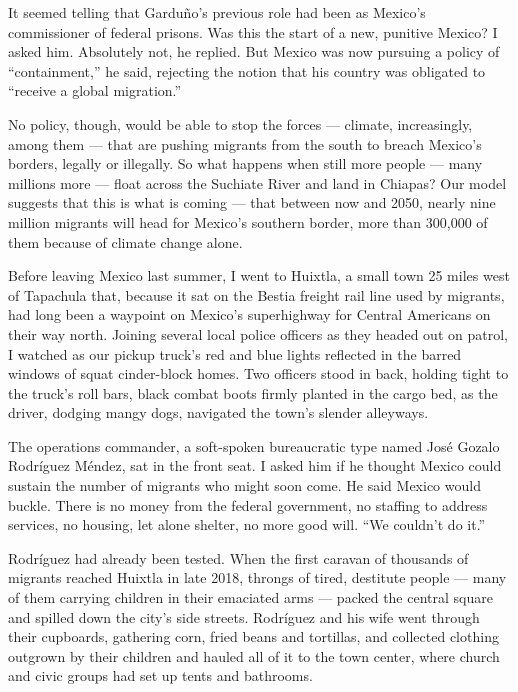 It seemed telling that Garduño's previous role had been as Mexico's
commissioner of federal prisons. Was this the start of a new, punitive
Mexico? I asked him. Absolutely not, he replied. But Mexico was now
pursuing a policy of ``containment,'' he said, rejecting the notion that
his country was obligated to ``receive a global migration.''

No policy, though, would be able to stop the forces --- climate,
increasingly, among them --- that are pushing migrants from the south to
breach Mexico's borders, legally or illegally. So what happens when
still more people --- many millions more --- float across the Suchiate
River and land in Chiapas? Our model suggests that this is what is
coming --- that between now and 2050, nearly nine million migrants will
head for Mexico's southern border, more than 300,000 of them because of
climate change alone.

Before leaving Mexico last summer, I went to Huixtla, a small town 25
miles west of Tapachula that, because it sat on the Bestia freight rail
line used by migrants, had long been a waypoint on Mexico's superhighway
for Central Americans on their way north. Joining several local police
officers as they headed out on patrol, I watched as our pickup truck's
red and blue lights reflected in the barred windows of squat
cinder-block homes. Two officers stood in back, holding tight to the
truck's roll bars, black combat boots firmly planted in the cargo bed,
as the driver, dodging mangy dogs, navigated the town's slender
alleyways.

The operations commander, a soft-spoken bureaucratic type named José
Gozalo Rodríguez Méndez, sat in the front seat. I asked him if he
thought Mexico could sustain the number of migrants who might soon come.
He said Mexico would buckle. There is no money from the federal
government, no staffing to address services, no housing, let alone
shelter, no more good will. ``We couldn't do it.''

Rodríguez had already been tested. When the first caravan of thousands
of migrants reached Huixtla in late 2018, throngs of tired, destitute
people --- many of them carrying children in their emaciated arms ---
packed the central square and spilled down the city's side streets.
Rodríguez and his wife went through their cupboards, gathering corn,
fried beans and tortillas, and collected clothing outgrown by their
children and hauled all of it to the town center, where church and civic
groups had set up tents and bathrooms.

